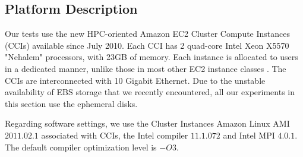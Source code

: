 \subsection{Platform Description}
    \label{subsec:ec2}
    Our tests use the new HPC-oriented Amazon EC2 Cluster Compute Instances
    (CCIs) available since July 2010. Each CCI has 2 quad-core Intel Xeon
    X5570 "Nehalem" processors, with 23GB of memory. Each instance is
    allocated to users in a dedicated manner, unlike those in most other EC2
    instance classes \cite{amazon:hpc}. The CCIs are interconnected with 10
    Gigabit Ethernet. Due to the unstable availability of EBS storage that we
    recently encountered, all our experiments in this section use the
    ephemeral disks. 

    Regarding software settings, we use the Cluster Instances Amazon Linux AMI
    $2011.02.1$ associated with CCIs, the Intel compiler $11.1.072$ and Intel
    MPI $4.0.1$. The default compiler optimization level is \emph{$-O3$}.
